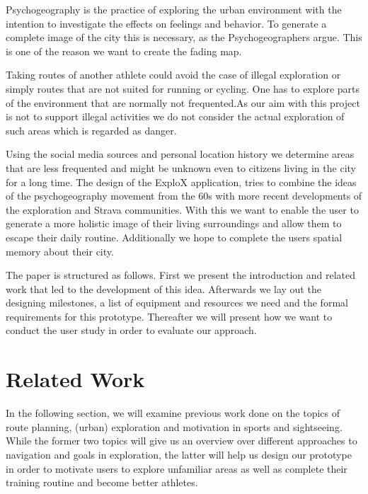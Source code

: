 \documentclass{sigchi}
\begin{document}
Psychogeography is the practice of exploring the urban environment with the intention to investigate the effects on feelings and behavior. To generate a complete image of the city this is necessary, as the Psychogeographers argue. This is one of the  reason we want to create the fading map.

Taking routes of another athlete could avoid the case of illegal exploration or simply routes that are not suited for running or cycling. One has to explore parts of the environment that are normally not frequented.As our aim with this project is not to support illegal activities we do not consider the actual exploration of such areas  which is regarded as danger.

Using the social media sources and personal location history we determine areas that are less frequented and might be unknown even to citizens living in the city for a long time. The design of the ExploX application, tries to combine the ideas of the psychogeography movement from the 60s with more recent developments of the exploration and Strava communities. With this we want to enable the user to generate a more holistic image of their living surroundings and allow them to escape their daily routine. Additionally we hope to complete the users spatial memory about their city.

The paper is structured as follows. First we present the introduction and related work that led to the development of this idea. Afterwards we lay out the designing milestones, a list of equipment and resources we need and the formal requirements for this prototype. Thereafter we will present how we want to conduct the user study in order to evaluate our approach. 

\section{Related Work}
In the following section, we will examine previous work done on the topics of route planning, (urban) exploration and motivation in sports and sightseeing. While the former two topics will give us an overview over different approaches to navigation and goals in exploration, the latter will help us design our prototype in order to motivate users to explore unfamiliar areas as well as complete their training routine and become better athletes.
\end{document}
